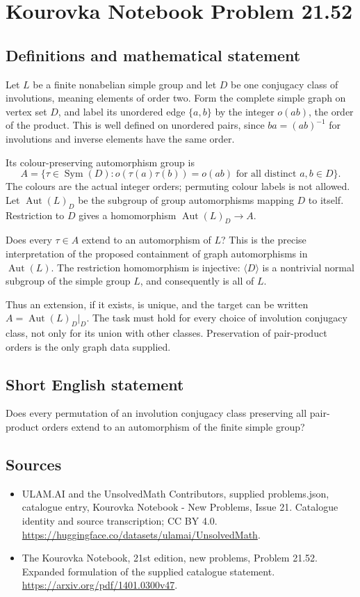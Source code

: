 \documentclass[11pt,a4paper]{article}
\begin{document}
\section*{Kourovka Notebook Problem 21.52}\label{statement}

\subsection{Definitions and mathematical statement}
Let $L$ be a finite nonabelian simple group and let $D$ be one conjugacy
class of involutions, meaning elements of order two. Form the complete
simple graph on vertex set $D$, and label its unordered edge $\{a,b\}$
by the integer $o(ab)$, the order of the product. This is well defined
on unordered pairs, since $ba=(ab)^{-1}$ for involutions and inverse
elements have the same order.

Its colour-preserving automorphism group is
\[
 A=\{\tau\in\operatorname{Sym}(D):
        o(\tau(a)\tau(b))=o(ab)\text{ for all distinct }a,b\in D\}.
\]
The colours are the actual integer orders; permuting colour labels
is not allowed. Let $\operatorname{Aut}(L)_D$ be the subgroup of group
automorphisms mapping $D$ to itself. Restriction to $D$ gives a homomorphism
$\operatorname{Aut}(L)_D\to A$.

Does every $\tau\in A$ extend to an automorphism of $L$? This is the
precise interpretation of the proposed containment of graph automorphisms
in $\operatorname{Aut}(L)$. The restriction homomorphism is injective:
$\langle D\rangle$ is a nontrivial normal subgroup of the simple group
$L$, and consequently is all of $L$.

Thus an extension, if it exists, is unique, and the target can be written
$A=\operatorname{Aut}(L)_D|_D$. The task must hold for every choice of
involution conjugacy class, not only for its union with other classes.
Preservation of pair-product orders is the only graph data supplied.
\subsection{Short English statement}
Does every permutation of an involution conjugacy class preserving all pair-product orders extend to an automorphism of the finite simple group?
\subsection{Sources}
\begin{itemize}
\item[S1] ULAM.AI and the UnsolvedMath Contributors, supplied problems.json, catalogue entry, Kourovka Notebook - New Problems, Issue 21. Catalogue identity and source transcription; CC BY 4.0.
\url{https://huggingface.co/datasets/ulamai/UnsolvedMath}.
\item[S2] The Kourovka Notebook, 21st edition, new problems, Problem 21.52. Expanded formulation of the supplied catalogue statement.
\url{https://arxiv.org/pdf/1401.0300v47}.
\end{itemize}
\end{document}
